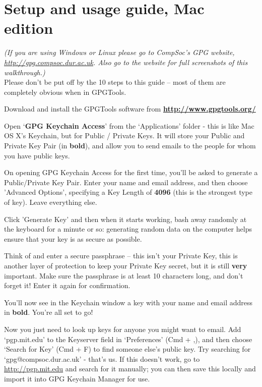 \section{Setup and usage guide, Mac edition}
\textit{(If you are using Windows or Linux please go to CompSoc's GPG website, \href{http://gpg.compsoc.dur.ac.uk}{http://gpg.compsoc.dur.ac.uk}. Also go to the website for full screenshots of this walkthrough.)} \\
Please don't be put off by the 10 steps to this guide -- most of them are completely obvious when in GPGTools.
\begin{compactenum}[1.]%
  \item Download and install the GPGTools software from \textbf{\href{http://www.gpgtools.org/}{http://www.gpgtools.org/}}
  \item Open `\textbf{GPG Keychain Access}' from the `Applications' folder - this is like Mac OS X's Keychain, but for Public / Private Keys. It will store your Public and Private Key Pair (in \textbf{bold}), and allow you to send emails to the people for whom you have public keys.
  \item On opening GPG Keychain Access for the first time, you'll be asked to generate a Public/Private Key Pair. Enter your name and email address, and then choose 'Advanced Options', specifying a Key Length of \textbf{4096} (this is the strongest type of key). Leave everything else.
  \item Click 'Generate Key' and then when it starts working, bash away randomly at the keyboard for a minute or so: generating random data on the computer helps ensure that your key is as secure as possible.
  \item Think of and enter a secure passphrase -- this isn't your Private Key, this is another layer of protection to keep your Private Key secret, but it is still \textbf{very} important. Make sure the passphrase is at least 10 characters long, and don't forget it! Enter it again for confirmation.
  \item You'll now see in the Keychain window a key with your name and email address in \textbf{bold}. You're all set to go! 
  \item Now you just need to look up keys for anyone you might want to email. Add `pgp.mit.edu' to the Keyserver field in `Preferences' (Cmd + ,), and then choose `Search for Key' (Cmd + F) to find someone else's public key. Try searching for `gpg@compsoc.dur.ac.uk' - that's us. If this doesn't work, go to \href{http://pgp.mit.edu}{http://pgp.mit.edu} and search for it manually; you can then save this locally and import it into GPG Keychain Manager for use.

\end{compactenum}
